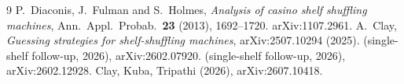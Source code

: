 \documentclass[11pt]{article}
\theoremstyle{definition}
\begin{document}
\begin{thebibliography}{9}
 P.~Diaconis, J.~Fulman and S.~Holmes,
  \emph{Analysis of casino shelf shuffling machines},
  Ann.\ Appl.\ Probab.\ \textbf{23} (2013), 1692--1720. arXiv:1107.2961.
 A.~Clay,
  \emph{Guessing strategies for shelf-shuffling machines},
  arXiv:2507.10294 (2025).
 (single-shelf follow-up, 2026), arXiv:2602.07920.
 (single-shelf follow-up, 2026), arXiv:2602.12928.
 Clay, Kuba, Tripathi (2026), arXiv:2607.10418.
\end{thebibliography}
\end{document}
